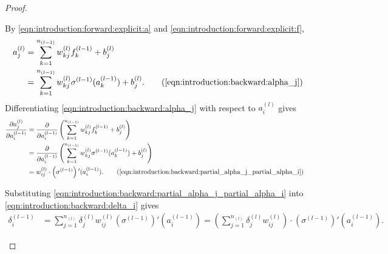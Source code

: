 \begin{proof}
\begin{step}
\begin{minipage}{0.25\textwidth}
\label{fig:introduction:backprop:between-successive-layers}
\end{minipage}%
\hfill%
\begin{minipage}{0.65\textwidth}
By \ref{eqn:introduction:forward:explicit:a} and \ref{eqn:introduction:forward:explicit:f}, 
\begin{subequations}\label{eqn:introduction:backward:alpha_j}
\begin{align*}
    a_{j}^{(l)} &= \sum_{k = 1}^{n_{(l-1)}} w_{kj}^{(l)} f_{k}^{(l-1)} + b^{(l)}_j \\ 
                     &= \sum_{k = 1}^{n_{(l-1)}} w_{kj}^{(l)} \sigma^{(l-1)}(a_{k}^{(l-1)}) + b^{(l)}_j. \tag{\ref{eqn:introduction:backward:alpha_j}} 
\end{align*}
\end{subequations}
Differentiating \ref{eqn:introduction:backward:alpha_j} with respect to $a_{i}^{(l)}$ gives 
\begin{subequations}\label{eqn:introduction:backward:partial_alpha_j_partial_alpha_i}
\begin{align*}
   \frac{\partial a_{j}^{(l)}}{\partial a_{i}^{(l-1)}} &= \frac{\partial}{\partial a_{i}^{(l-1)}} \left ( \sum_{k = 1}^{n_{(l-1)}} w_{kj}^{(l)} f_{k}^{(l-1)} + b^{(l)}_j \right ) & \\ 
                     &= \frac{\partial}{\partial a_{i}^{(l-1)}} \left ( \sum_{k = 1}^{n_{(l-1)}} w_{kj}^{(l)} \sigma^{(l-1)}(a_{k}^{(l-1)}) + b^{(l)}_j \right ) & \\ 
                     &= w_{ij}^{(l)} \cdot \left(\sigma^{(l-1)}\right){'} ( a_{i}^{(l-1)}). \tag{\ref{eqn:introduction:backward:partial_alpha_j_partial_alpha_i}} 
\end{align*}
\end{subequations}
\end{minipage}
Substituting \ref{eqn:introduction:backward:partial_alpha_j_partial_alpha_i} into \ref{eqn:introduction:backward:delta_i} gives \begin{align*}
    \delta_i^{(l-1)} &= \sum_{j=1}^{n_{(l)}} \delta_j^{(l)} w_{ij}^{(l)} \left(\sigma^{(l-1)}\right){'} ( a_{i}^{(l-1)}) 
                = \left (\sum_{j=1}^{n_{(l)}}  \delta_j^{(l)} w_{ij}^{(l)} \right) \cdot \left(\sigma^{(l-1)}\right){'} ( a_{i}^{(l-1)}).
\end{align*}
\end{step}
\end{proof}
